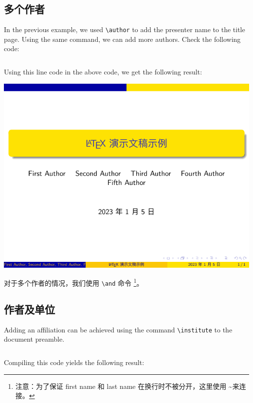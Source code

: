 \subsection{多个作者}

In the previous example, we used \verb|\author| to add the presenter name to the title page. Using the same command, we can add more authors. Check the following code:

\inputminted[linenos=true]{latex}{examples/beamer/title-page-multiple-authors.tex}

Using this line code in the above code, we get the following result:

\includegraphics{examples/beamer/title-page-multiple-authors.pdf}

对于多个作者的情况，我们使用 \verb|\and| 命令
\footnote{注意：为了保证 first name 和 last name 在换行时不被分开，这里使用 \textasciitilde 来连接。}。

\subsection{作者及单位}

Adding an affiliation can be achieved using the command \verb|\institute| to the document preamble.

\inputminted[linenos=true]{latex}{examples/beamer/title-page-affliation.tex}

Compiling this code yields the following result:

